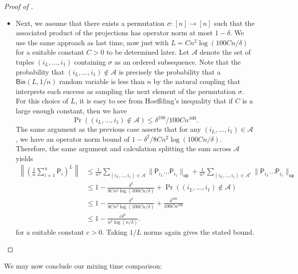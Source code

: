 \documentclass[11pt]{article}
\begin{document}
\begin{proof}[Proof of ]
\begin{itemize}
        \item Next, we assume that there exists a permutation $\sigma:[n]\to [n]$ such that the associated product of the projections has operator norm at most $1-\delta$. We use the same approach as last time, now just with $L = Cn^2\log(100Cn/\delta)$ for a suitable constant $C>0$ to be determined later. Let $\mathcal{A}$ denote the set of tuples $(i_L,\ldots,i_1)$ containing $\sigma$ as an ordered subsequence. Note that the probability that $(i_L,\ldots,i_1)\not\in \mathcal{A}$ is precisely the probability that a $\mathsf{Bin}(L,1/n)$ random variable is less than $n$ by the natural coupling that interprets each success as sampling the next element of the permutation $\sigma$. For this choice of $L$, it is easy to see from Hoeffding's inequality that if $C$ is a large enough constant, then we have
        \begin{equation*}
            \Pr((i_L,\ldots,i_1)\not\in \mathcal{A})\leq \delta^{100}/100Cn^{100}.
        \end{equation*}
        The same argument as the previous case asserts that for any $(i_L,\ldots,i_1)\in \mathcal{A}$, we have an operator norm bound of $1-\delta^2/8Cn^2\log(100Cn/\delta)$. Therefore, the same argument and calculation splitting the sum across $\mathcal{A}$ yields
        \begin{align*}
            \left\|\left(\frac{1}{n}\sum_{i=1}^n \mathsf{P}_i\right)^L\right\|&\leq \frac{1}{n^L}\sum_{(i_L,\ldots,i_1)\in \mathcal{A}} \|\mathsf{P}_{i_L}\ldots \mathsf{P}_{i_1}\|_{\mathsf{op}}+\frac{1}{n^L}\sum_{(i_L,\ldots,i_1)\in \mathcal{A}^c} \|\mathsf{P}_{i_L}\ldots \mathsf{P}_{i_1}\|_{\mathsf{op}}\\
            &\leq 1-\frac{\delta^2}{8Cn^2\log(100Cn/\delta)}+\Pr((i_L,\ldots,i_1)\not\in \mathcal{A})\\
            &\leq 1-\frac{\delta^2}{8Cn^2\log(100Cn/\delta)}+\frac{\delta^{100}}{100Cn^{100}}\\
            &\leq 1-\frac{c\delta^2}{n^2\log(n/\delta)}.
        \end{align*}
        for a suitable constant $c>0$. Taking $1/L$ norms again gives the stated bound.\qedhere
    \end{itemize}
\end{proof}

We may now conclude our mixing time comparison:
\end{document}
